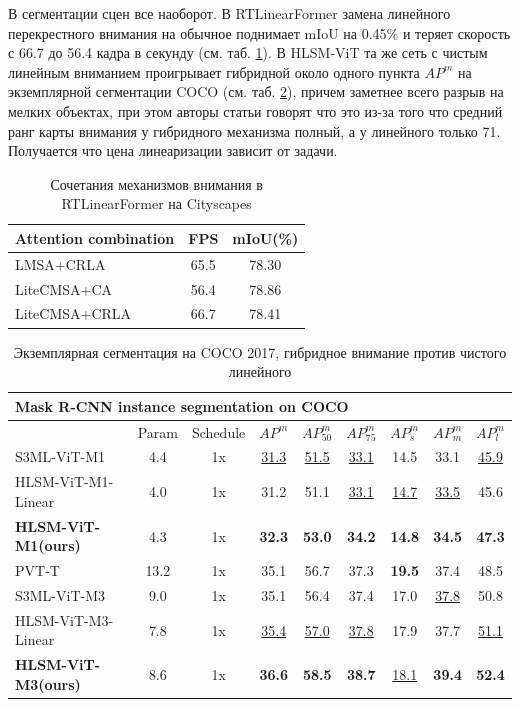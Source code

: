 \documentclass[areasetadvanced]{scrartcl}
\begin{document}
		В сегментации сцен все наоборот. В RTLinearFormer замена линейного перекрестного внимания на обычное поднимает mIoU на
		0.45\% и теряет скорость с 66.7 до 56.4 кадра в секунду (см. таб. \ref{tab:rtlfattn}). В HLSM-ViT та же сеть с чистым линейным
		вниманием проигрывает гибридной около одного пункта $AP^m$ на экземплярной сегментации COCO (см. таб. \ref{tab:hlsm6}), причем заметнее всего
		разрыв на мелких объектах, при этом авторы статьи говорят что это из-за того что средний ранг карты внимания у гибридного механизма полный, а у линейного только 71.
		Получается что цена линеаризации зависит от задачи.

		\begin{table}[H]
			\centering
			\footnotesize
			\caption{Сочетания механизмов внимания в RTLinearFormer на Cityscapes \cite{rtlinearformer}}
			\label{tab:rtlfattn}
			\begin{tabular}{lcc}
				\toprule
				Attention combination & FPS & mIoU(\%) \\
				\midrule
				LMSA+CRLA & 65.5 & 78.30 \\
				LiteCMSA+CA & 56.4 & 78.86 \\
				LiteCMSA+CRLA & 66.7 & 78.41 \\
				\bottomrule
			\end{tabular}
		\end{table}

		\begin{table}[H]
			\centering
			\footnotesize
			\caption{Экземплярная сегментация на COCO 2017, гибридное внимание против чистого линейного \cite{hlsmvit}}
			\label{tab:hlsm6}
			\setlength{\tabcolsep}{4pt}
			\begin{tabular}{lcccccccc}
				\toprule
				\multicolumn{9}{l}{Mask R-CNN instance segmentation on COCO} \\
				\midrule
				 & Param & Schedule & $AP^m$ & $AP^m_{50}$ & $AP^m_{75}$ & $AP^m_s$ & $AP^m_m$ & $AP^m_l$ \\
				\midrule
				S3ML-ViT-M1 & 4.4 & 1x & \underline{31.3} & \underline{51.5} & \underline{33.1} & 14.5 & 33.1 & \underline{45.9} \\
				HLSM-ViT-M1-Linear & 4.0 & 1x & 31.2 & 51.1 & \underline{33.1} & \underline{14.7} & \underline{33.5} & 45.6 \\
				\textbf{HLSM-ViT-M1(ours)} & 4.3 & 1x & \textbf{32.3} & \textbf{53.0} & \textbf{34.2} & \textbf{14.8} & \textbf{34.5} & \textbf{47.3} \\
				\midrule
				PVT-T & 13.2 & 1x & 35.1 & 56.7 & 37.3 & \textbf{19.5} & 37.4 & 48.5 \\
				S3ML-ViT-M3 & 9.0 & 1x & 35.1 & 56.4 & 37.4 & 17.0 & \underline{37.8} & 50.8 \\
				HLSM-ViT-M3-Linear & 7.8 & 1x & \underline{35.4} & \underline{57.0} & \underline{37.8} & 17.9 & 37.7 & \underline{51.1} \\
				\textbf{HLSM-ViT-M3(ours)} & 8.6 & 1x & \textbf{36.6} & \textbf{58.5} & \textbf{38.7} & \underline{18.1} & \textbf{39.4} & \textbf{52.4} \\
				\bottomrule
			\end{tabular}
		\end{table}
\end{document}
